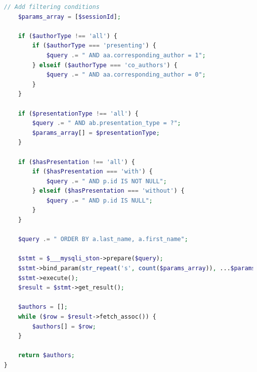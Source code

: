 \documentclass[11pt,a4paper]{article}
\begin{document}
\begin{lstlisting}[language=PHP, caption=Autorenfilterung und Session-Management]
    // Add filtering conditions
    $params_array = [$sessionId];
    
    if ($authorType !== 'all') {
        if ($authorType === 'presenting') {
            $query .= " AND aa.corresponding_author = 1";
        } elseif ($authorType === 'co_authors') {
            $query .= " AND aa.corresponding_author = 0";
        }
    }
    
    if ($presentationType !== 'all') {
        $query .= " AND ab.presentation_type = ?";
        $params_array[] = $presentationType;
    }
    
    if ($hasPresentation !== 'all') {
        if ($hasPresentation === 'with') {
            $query .= " AND p.id IS NOT NULL";
        } elseif ($hasPresentation === 'without') {
            $query .= " AND p.id IS NULL";
        }
    }
    
    $query .= " ORDER BY a.last_name, a.first_name";
    
    $stmt = $___mysqli_ston->prepare($query);
    $stmt->bind_param(str_repeat('s', count($params_array)), ...$params_array);
    $stmt->execute();
    $result = $stmt->get_result();
    
    $authors = [];
    while ($row = $result->fetch_assoc()) {
        $authors[] = $row;
    }
    
    return $authors;
}
\end{lstlisting}
\end{document}
